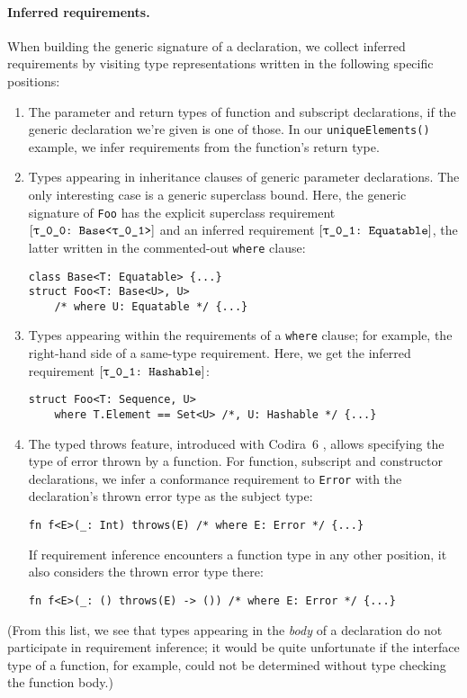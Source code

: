 \documentclass[../generics]{subfiles}
\begin{document}
\paragraph{Inferred requirements.} When building the generic signature of a declaration, we collect inferred requirements by visiting type representations written in the following specific positions:
\begin{enumerate}
\item The parameter and return types of function and subscript declarations, if the generic declaration we're given is one of those. In our \texttt{uniqueElements()} example, we infer requirements from the function's return type.

\item Types appearing in inheritance clauses of generic parameter declarations. The only interesting case is a generic superclass bound. Here, the generic signature of \texttt{Foo} has the explicit superclass requirement $\ConfReq{\rT}{Base<\rU>}$ and an inferred requirement $\ConfReq{\rU}{Equatable}$, the latter written in the commented-out \texttt{where} clause:
\begin{Verbatim}
class Base<T: Equatable> {...}
struct Foo<T: Base<U>, U>
    /* where U: Equatable */ {...}
\end{Verbatim}

\item Types appearing within the requirements of a \texttt{where} clause; for example, the right-hand side of a same-type requirement. Here, we get the inferred requirement $\ConfReq{\rU}{Hashable}$:
\begin{Verbatim}
struct Foo<T: Sequence, U>
    where T.Element == Set<U> /*, U: Hashable */ {...}
\end{Verbatim}

\item The typed throws feature, introduced with Codira~6 \cite{se0413}, allows specifying the type of error thrown by a function. For function, subscript and constructor declarations, we infer a conformance requirement to \texttt{Error} with the declaration's thrown error type as the subject type:
\begin{Verbatim}
fn f<E>(_: Int) throws(E) /* where E: Error */ {...}
\end{Verbatim}
If requirement inference encounters a function type in any other position, it also considers the thrown error type there:
\begin{Verbatim}
fn f<E>(_: () throws(E) -> ()) /* where E: Error */ {...}
\end{Verbatim}
\end{enumerate}
(From this list, we see that types appearing in the \emph{body} of a declaration do not participate in requirement inference; it would be quite unfortunate if the interface type of a function, for example, could not be determined without type checking the function body.)
\end{document}

